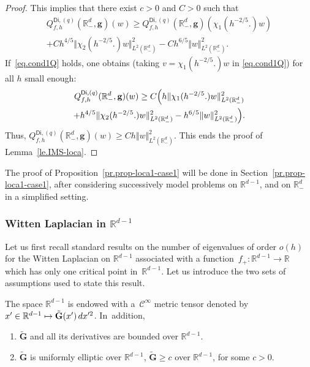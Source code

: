 \documentclass[10pt]{amsart}
\newenvironment{enumeratei}
{\bgroup\def\theenumi{\roman{enumi}}\def\theenumii{\arabic{enumii}}\begin{enumerate}}
{\end{enumerate}\egroup}
\newcommand\mto{\mathchoice{\longmapsto}{\mapsto}{\mapsto}{\mapsto}}
\newcommand{\mbf}[1]{\mathbf{#1}}
\theoremstyle{plain}
\theoremstyle{definition}
\newenvironment{manualassumption}[1]{%
\renewcommand\themanualassumptioninner{#1}%
\manualassumptioninner}{\endmanualassumptioninner}
\begin{document}
\begin{proof}
This implies that there exist $c>0$ and $C>0$ such that
\begin{multline*}
Q_{f,h}^{\mathsf{Di},(q)}(\mathbb R^d_-,\mbf g)(w)\ge Q_{f,h}^{\mathsf{Di},(q)}(\mathbb R^d_-,\mbf g)(\chi_1(h^{-2/5 }.)w)\\+Ch^{4/5}\Vert \chi_2(h^{-2/5 }.) w \Vert_{L^2(\mathbb R_-^d)}^2
-Ch^{6/5} \Vert w \Vert_{L^2(\mathbb R_-^d)}^2.
\end{multline*}
If~\eqref{eq.cond1Q} holds,
one obtains (taking $v=\chi_1(h^{-2/5 }.) w$ in \eqref{eq.cond1Q}) for all $h$ small enough:
\begin{multline*}
Q_{f,h}^{\mathsf{Di},(q)}(\mathbb R^d_-,\mbf g)(w)\ge C\Bigl(h \Vert
\chi_1(h^{-2/5
}.) w
\Vert_{L^2(\mathbb
R_-^d)}^2\\
+
h^{4/5}
\Vert
\chi_2(h^{-2/5
}.) w
\Vert_{L^2(\mathbb
R_-^d)}^2- h^{6/5} \Vert w \Vert_{L^2(\mathbb R_-^d)}^2\Bigr).
\end{multline*}
Thus, $Q_{f,h}^{\mathsf{Di},(q)}(\mathbb R^d_-,\mbf g)(w)\ge Ch \Vert w \Vert_{L^2(\mathbb R_-^d)}^2$. This ends the proof of Lemma~\ref{le.IMS-loca}.
\end{proof}
The proof of Proposition~\ref{pr.prop-loca1-case1} will be done in
Section~\ref{pr.prop-loca1-case1}, after considering successively
model problems on $\mathbb R^{d-1}$, and on $\mathbb R^d_-$ in a
simplified setting.

\subsubsection{Witten Laplacian in $\mathbb R^{d-1}$}\label{sec.Rdmoins_d-1}
Let us first recall standard results on the number of eigenvalues of
order $o(h)$ for the Witten Laplacian on $\mathbb R^{d-1}$ associated with a function~$f_+:\mathbb R^{d-1}\to \mathbb R$ which has only one critical point in~$\mathbb R^{d-1}$.
Let us introduce the two sets of assumptions used to state this result.

\begin{manualassumption}{$(\textup{Metric-}\mathbb R^{d-1})$}\label{MetricRd-1}
The space ${\mathbb R^{d-1}}$ is endowed with a~$\mathcal C^\infty$ metric tensor denoted by $x'\in \mathbb R^{d-1} \mto \tilde {\mbf G}(x')\, dx'^2$. In~addition,
\begin{enumeratei}
\item\label{MetricRd-1i}
$\tilde {\mbf G}$ and all its derivatives are bounded over ${\mathbb R^{d-1}}$.
\item\label{MetricRd-1ii}
$ \tilde {\mbf G}$ is uniformly elliptic over $ {\mathbb
R^{d-1}}$, \ie $ \tilde {\mbf G}\ge c$ over $\mathbb R^{d-1}$, for some $c>0$.
\end{enumeratei}
\end{manualassumption}
\end{document}
